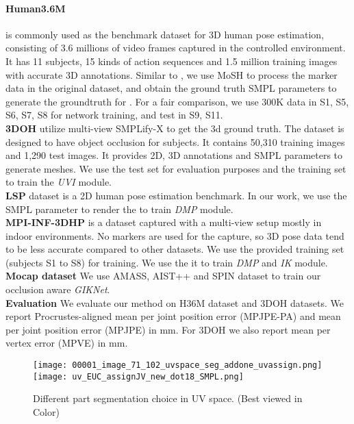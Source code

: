 \documentclass[10pt,twocolumn,letterpaper]{article}
\begin{document}
 \paragraph{Human3.6M} \cite{h36m_pami}  is commonly used as the benchmark
dataset for 3D human pose estimation, consisting of 3.6 millions of video frames captured in the controlled environment. It has 11 subjects, 15 kinds of action sequences and 1.5 million training images with accurate 3D
annotations. Similar to \cite{HMR}, we use MoSH to process the marker data in the original dataset, and obtain the ground truth SMPL parameters to generate the groundtruth for . For a fair comparison, we use 300K data in S1, S5, S6, S7, S8 for network training, and test in S9, S11. 
\\
\textbf{3DOH} \cite{3DOH} utilize multi-view SMPLify-X \cite{SMPL-X:2019} to get the 3d ground truth. The dataset is designed to have object occlusion for subjects. It contains 50,310 training images and 1,290
test images. It provides 2D, 3D annotations and SMPL parameters to generate meshes. We use the test set for evaluation purposes and the training set to train the \textit{UVI} module. 
\\
\textbf{LSP} \cite{lsp} dataset is a 2D human pose estimation
benchmark. In our work, we use the \cite{up3d} SMPL parameter to render the  to train \textit{DMP} module.
\\
\textbf{MPI-INF-3DHP} \cite{mono_3dhp2017} is a dataset captured with a multi-view
setup mostly in indoor environments. No markers are used for the capture, so 3D pose data tend to be less accurate compared to other datasets. We use the provided training
set (subjects S1 to S8) for training. We use the it to train \textit{DMP} and \textit{IK} module.
\\
\textbf{Mocap dataset} We use \cite{AMASS:ICCV:2019} AMASS, AIST++ \cite{aist++} and SPIN \cite{spin} dataset to train our occlusion aware \textit{GIKNet}. 
\\
\textbf{Evaluation} We evaluate our method on H36M \cite{h36m_pami} dataset and  3DOH \cite{3DOH} datasets. We report Procrustes-aligned mean per joint position error (MPJPE-PA) and mean per joint position error (MPJPE) in mm. For 3DOH we also report mean per vertex error (MPVE) in mm.

\begin{figure}
\centering
\texttt{[image: 00001\_image\_71\_102\_uvspace\_seg\_addone\_uvassign.png]}
\texttt{[image: uv\_EUC\_assignJV\_new\_dot18\_SMPL.png]}
\caption{{Different part segmentation choice in UV space. (Best viewed in Color) }}
\label{fig:uvpartseg14and24}
\end{figure}
\end{document}
